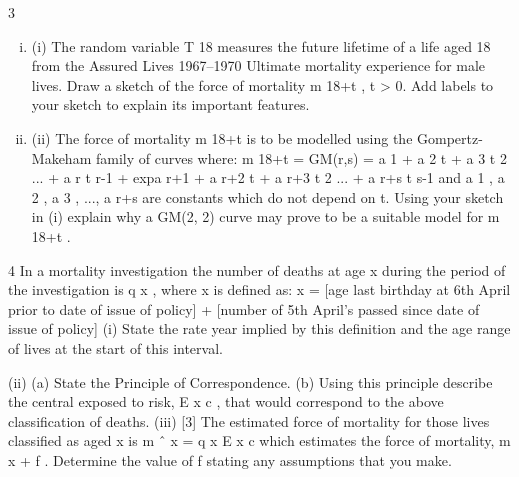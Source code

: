 \documentclass[a4paper,12pt]{article}
\begin{document}
\begin{enumerate}

3

\begin{enumerate}[(i)]
\item (i)
The random variable T 18 measures the future lifetime of a life aged 18 from the Assured Lives 1967–1970 Ultimate mortality experience for male lives.
Draw a sketch of the force of mortality m 18+t , t > 0. Add labels to your sketch
to explain its important features.
\item (ii)
The force of mortality m 18+t is to be modelled using the Gompertz-Makeham family of curves where:
m 18+t = GM(r,s) = a 1 + a 2 t + a 3 t 2 ... + a r t r-1
+ exp{a r+1 + a r+2 t + a r+3 t 2 ... + a r+s t s-1 }
and a 1 , a 2 , a 3 , ..., a r+s are constants which do not depend on t.
Using your sketch in (i) explain why a GM(2, 2) curve may prove to be a suitable model for m 18+t .
\end{enumerate}
4
In a mortality investigation the number of deaths at age x during the period of the investigation is q x , where x is defined as:
x = [age last birthday at 6th April prior to date of issue of policy]
+ [number of 5th April’s passed since date of issue of policy]
(i) State the rate year implied by this definition and the age range of lives at the
start of this interval.

(ii) (a)
State the Principle of Correspondence.
(b)
Using this principle describe the central exposed to risk, E x c , that
would correspond to the above classification of deaths.
(iii)
[3]
The estimated force of mortality for those lives classified as aged x is m ˆ x =
q x
E x c
which estimates the force of mortality, m x + f . Determine the value of f stating
any assumptions that you make.


\end{enumerate}
\end{document}
